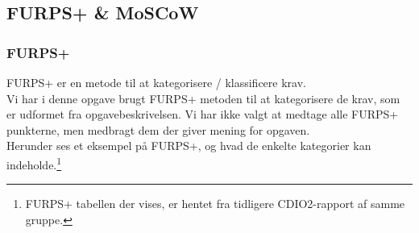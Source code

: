 \subsection{FURPS+ \& MoSCoW}

\subsubsection{FURPS+}

FURPS+ er en metode til at kategorisere / klassificere krav. \\
Vi har i denne opgave brugt FURPS+ metoden til at kategorisere de krav, som er udformet fra opgavebeskrivelsen.
Vi har ikke valgt at medtage alle FURPS+ punkterne, men medbragt dem der giver mening for opgaven. \\
Herunder ses et eksempel på FURPS+, og hvad de enkelte kategorier kan indeholde.\footnote{FURPS+ tabellen der vises, er hentet fra tidligere CDIO2-rapport af samme gruppe.}


